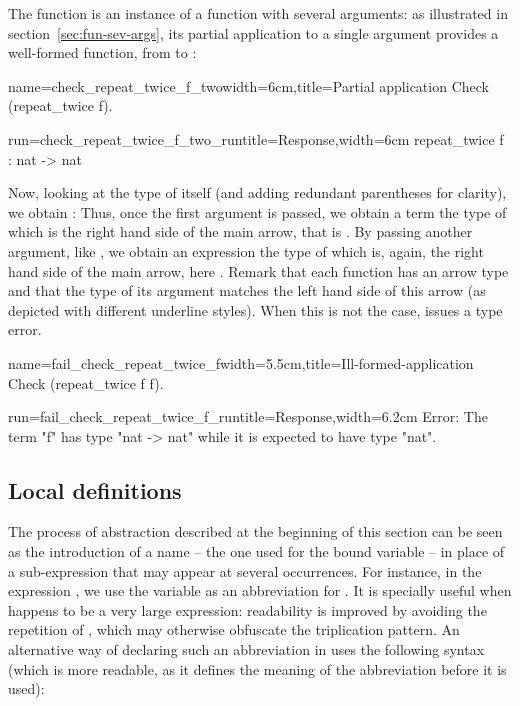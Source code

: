 The function   is an instance of a function with several
arguments: as illustrated in section~\ref{sec:fun-sev-args}, its
partial application to a single argument provides a well-formed
function, from  to :

\begin{coq-left}{name=check_repeat_twice_f_two}{width=6cm,title=Partial application}
Check (repeat_twice f).
\end{coq-left}
\begin{coqout-right}{run=check_repeat_twice_f_two_run}{title=Response,width=6cm}
repeat_twice f : nat -> nat
\end{coqout-right}

Now, looking at the type of  itself
(and adding redundant parentheses for clarity),
we obtain :
Thus, once the first argument
 is passed, we obtain a term the type of which is
the right hand side of the main arrow, that is .
By passing another argument, like , we obtain an expression
the type of which is, again, the right hand side of the main arrow,
here .
Remark that each function has an arrow type and that the type of its
argument matches the left hand side of this arrow (as depicted with
different underline styles). When this is not the case, \Coq{} issues a
type error.

\begin{coq-left}{name=fail_check_repeat_twice_f}{width=5.5cm,title=Ill-formed-application}
Check (repeat_twice f f).
\end{coq-left}
\begin{coqout-right}{run=fail_check_repeat_twice_f_run}{title=Response,width=6.2cm}
Error: The term "f" has type "nat -> nat"
while it is expected to have type "nat".
\end{coqout-right}

\subsection{Local definitions}

The process of abstraction described at the beginning of this section
can be seen as the introduction of a name -- the one used for the
bound variable -- in place of a sub-expression that may appear at
several occurrences. For instance, in the expression
, we use the variable  as an
abbreviation for . It is specially useful when  happens to
be a very large expression: readability is improved by avoiding the
repetition of , which may otherwise obfuscate the triplication
pattern.  An alternative way of declaring such an abbreviation in
\Coq{} uses the following syntax (which is more readable, as it
defines the meaning of the abbreviation  before it is used):

